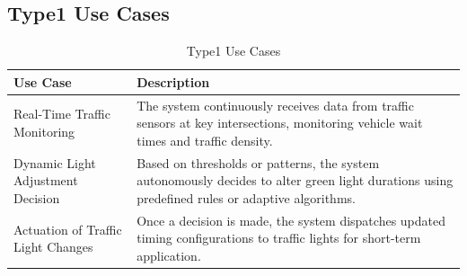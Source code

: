 \documentclass[a4paper,12pt]{article}
\begin{document}
\subsection*{Type1 Use Cases}
\begin{table}[h!]
\centering
\begin{tabular}{|p{4.5cm}|p{8.5cm}|}
\hline
\textbf{Use Case} & \textbf{Description} \\
\hline
Real-Time Traffic Monitoring & The system continuously receives data from traffic sensors at key intersections, monitoring vehicle wait times and traffic density. \\
\hline
Dynamic Light Adjustment Decision & Based on thresholds or patterns, the system autonomously decides to alter green light durations using predefined rules or adaptive algorithms. \\
\hline
Actuation of Traffic Light Changes & Once a decision is made, the system dispatches updated timing configurations to traffic lights for short-term application. \\
\hline
\end{tabular}
\caption{Type1 Use Cases}
\end{table}
\end{document}
